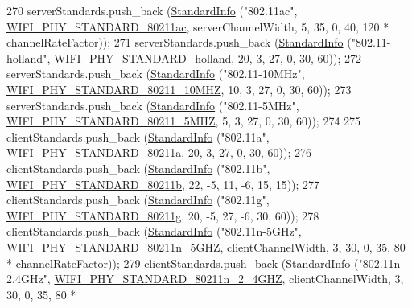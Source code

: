 \begin{DoxyCode}
270   serverStandards.push\_back (\hyperlink{structStandardInfo}{StandardInfo} (\textcolor{stringliteral}{"802.11ac"}, 
      \hyperlink{group__wifi_gga1299834f4e1c615af3ca738033b76a49a7c078959de635b84fb280a955dcfb27e}{WIFI\_PHY\_STANDARD\_80211ac}, serverChannelWidth, 5, 35, 0, 40, 120 * 
      channelRateFactor));
271   serverStandards.push\_back (\hyperlink{structStandardInfo}{StandardInfo} (\textcolor{stringliteral}{"802.11-holland"}, 
      \hyperlink{group__wifi_gga1299834f4e1c615af3ca738033b76a49aca926d77ddca0fc6d8cdcb190b2e520e}{WIFI\_PHY\_STANDARD\_holland}, 20, 3, 27, 0, 30, 60));
272   serverStandards.push\_back (\hyperlink{structStandardInfo}{StandardInfo} (\textcolor{stringliteral}{"802.11-10MHz"}, 
      \hyperlink{group__wifi_gga1299834f4e1c615af3ca738033b76a49aff863c98db467eb76170dc8bbe743de7}{WIFI\_PHY\_STANDARD\_80211\_10MHZ}, 10, 3, 27, 0, 30, 60));
273   serverStandards.push\_back (\hyperlink{structStandardInfo}{StandardInfo} (\textcolor{stringliteral}{"802.11-5MHz"}, 
      \hyperlink{group__wifi_gga1299834f4e1c615af3ca738033b76a49a8311083bdd8ae58e73ab6e81a53fd7be}{WIFI\_PHY\_STANDARD\_80211\_5MHZ}, 5, 3, 27, 0, 30, 60));
274 
275   clientStandards.push\_back (\hyperlink{structStandardInfo}{StandardInfo} (\textcolor{stringliteral}{"802.11a"}, 
      \hyperlink{group__wifi_gga1299834f4e1c615af3ca738033b76a49a22db1e8022db2c3450414b86c77b11e4}{WIFI\_PHY\_STANDARD\_80211a}, 20, 3, 27, 0, 30, 60));
276   clientStandards.push\_back (\hyperlink{structStandardInfo}{StandardInfo} (\textcolor{stringliteral}{"802.11b"}, 
      \hyperlink{group__wifi_gga1299834f4e1c615af3ca738033b76a49a77e1cc9f77a0bce8e2bc82cbef437b5a}{WIFI\_PHY\_STANDARD\_80211b}, 22, -5, 11, -6, 15, 15));
277   clientStandards.push\_back (\hyperlink{structStandardInfo}{StandardInfo} (\textcolor{stringliteral}{"802.11g"}, 
      \hyperlink{group__wifi_gga1299834f4e1c615af3ca738033b76a49aeda6d90f260393ce003ec4765d8100af}{WIFI\_PHY\_STANDARD\_80211g}, 20, -5, 27, -6, 30, 60));
278   clientStandards.push\_back (\hyperlink{structStandardInfo}{StandardInfo} (\textcolor{stringliteral}{"802.11n-5GHz"}, 
      \hyperlink{group__wifi_gga1299834f4e1c615af3ca738033b76a49aaabe94a0be4668583c42595437b4a6c0}{WIFI\_PHY\_STANDARD\_80211n\_5GHZ}, clientChannelWidth, 3, 30, 0, 35, 80 * 
      channelRateFactor));
279   clientStandards.push\_back (\hyperlink{structStandardInfo}{StandardInfo} (\textcolor{stringliteral}{"802.11n-2.4GHz"}, 
      \hyperlink{group__wifi_gga1299834f4e1c615af3ca738033b76a49a6e449a5ca14fc7c0eb36064ce04a5192}{WIFI\_PHY\_STANDARD\_80211n\_2\_4GHZ}, clientChannelWidth, 3, 30, 0, 35, 80 * 

\end{DoxyCode}
